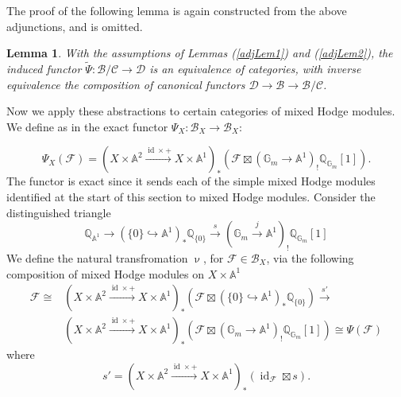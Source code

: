 \documentclass[a4paper,10pt]{amsart}
\renewcommand{\nu}{\upnu}
\renewcommand{\eta}{\upeta}
\newtheorem{lemma}[theorem]{Lemma}
\DeclareMathOperator{\Hom}{Hom}
\DeclareMathOperator{\id}{id}
\begin{document}
The proof of the following lemma is again constructed from the above adjunctions, and is omitted.
\begin{lemma}
With the assumptions of Lemmas (\ref{adjLem1}) and (\ref{adjLem2}), the induced functor $\tilde{\Psi}\colon \mathcal{B}/\mathcal{C}\rightarrow\mathcal{D}$ is an equivalence of categories, with inverse equivalence the composition of canonical functors $\mathcal{D}\rightarrow \mathcal{B}\rightarrow\mathcal{B}/\mathcal{C}$.
\end{lemma}
Now we apply these abstractions to certain categories of mixed Hodge modules.  We define as in \cite{KS2} the exact functor $\Psi_X\colon\mathcal{B}_X\rightarrow\mathcal{B}_X$:

\[
\Psi_X(\mathcal{F})=(X\times\mathbb{A}^2\xrightarrow{\id\times +} X\times \mathbb{A}^1)_*\left(\mathcal{F}\boxtimes (\mathbb{G}_m\rightarrow\mathbb{A}^1)_!\mathbb{Q}_{\mathbb{G}_m}[1]\right).
\] 
The functor is exact since it sends each of the simple mixed Hodge modules identified at the start of this section to mixed Hodge modules.  Consider the distinguished triangle 
\[
 \mathbb{Q}_{\mathbb{A}^1}\rightarrow (\{0\}\hookrightarrow \mathbb{A}^1)_*\mathbb{Q}_{\{0\}} \xrightarrow{s}(\mathbb{G}_m\xrightarrow{j} \mathbb{A}^1)_!\mathbb{Q}_{\mathbb{G}_m}[1]
\]
We define the natural transfromation $\nu$, for $\mathcal{F}\in\mathcal{B}_X$, via the following composition of mixed Hodge modules on $X\times\mathbb{A}^1$
\begin{align*}
\mathcal{F}\cong&(X\times\mathbb{A}^2\xrightarrow{\id\times +} X\times \mathbb{A}^1)_*\left(\mathcal{F}\boxtimes (\{0\}\hookrightarrow\mathbb{A}^1)_*\mathbb{Q}_{\{0\}}\right)\xrightarrow{s'}\\
&(X\times\mathbb{A}^2\xrightarrow{\id\times +} X\times \mathbb{A}^1)_*\left(\mathcal{F}\boxtimes (\mathbb{G}_m\rightarrow\mathbb{A}^1)_!\mathbb{Q}_{\mathbb{G}_m}[1]\right)\cong\Psi(\mathcal{F})
\end{align*}
where 
\[
s'=(X\times\mathbb{A}^2\xrightarrow{\id\times +} X\times \mathbb{A}^1)_*\left(\id_{\mathcal{F}}\boxtimes s\right).
\]
\end{document}
